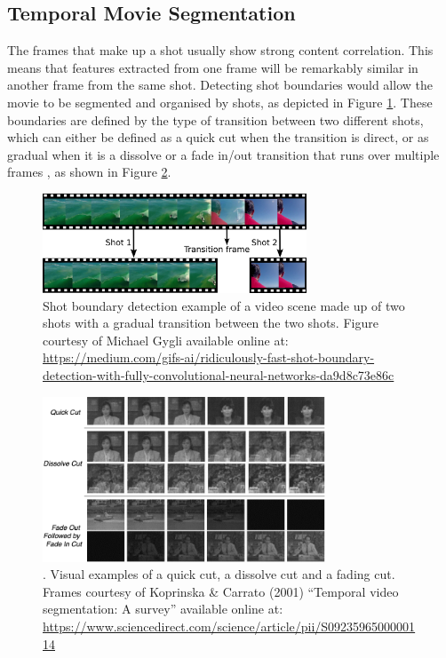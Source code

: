 
\subsection{Temporal Movie Segmentation}

The frames that make up a shot usually show strong content correlation. This means that features extracted from one frame will be remarkably similar in another frame from the same shot. Detecting shot boundaries would allow the movie to be segmented and organised by shots, as depicted in Figure \ref{fig:shot_boundary_detection}. These boundaries are defined by the type of transition between two different shots, which can either be defined as a quick cut when the transition is direct, or as gradual when it is a dissolve or a fade in/out transition that runs over multiple frames \cite{yuan2007shotboundary}, as shown in Figure \ref{fig:video_transitions}.

\begin{figure}[h] 
\centerline{\includegraphics[width=0.70\textwidth]{figures/litsurvey/shot_boundary_detection.png}}
\caption{\label{fig:shot_boundary_detection}Shot boundary detection example of a video scene made up of two shots with a gradual transition between the two shots. Figure courtesy of Michael Gygli available online at: \url{https://medium.com/gifs-ai/ridiculously-fast-shot-boundary-detection-with-fully-convolutional-neural-networks-da9d8c73e86c}}
\end{figure}

\begin{figure}[h] 
\centerline{\includegraphics[width=0.75\textwidth]{figures/litsurvey/video_transitions.png}}
\caption{\label{fig:video_transitions}. Visual examples of a quick cut, a dissolve cut and a fading cut. Frames courtesy of Koprinska \& Carrato (2001) ``Temporal video segmentation: A survey'' available online at: \url{https://www.sciencedirect.com/science/article/pii/S0923596500000114}}
\end{figure}

